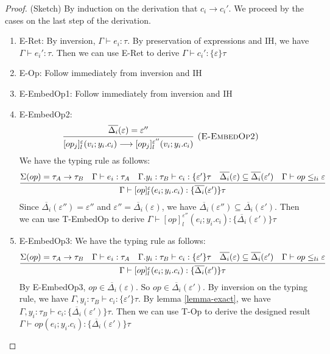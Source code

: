 \begin{proof} (Sketch)
By induction on the derivation that $c_i \longrightarrow c_i'$. We proceed by the cases on the last step of the derivation.

\begin{enumerate}
\item E-Ret: By inversion, $\Gamma \vdash e_i: \tau$. By preservation of expressions and IH, we have  $\Gamma \vdash e_i': \tau$. Then we can use E-Ret to derive $\Gamma  \vdash c_i' : \{\varepsilon\} \tau$
\item E-Op: Follow immediately from inversion and IH
\item E-EmbedOp1: Follow immediately from inversion and IH
\item E-EmbedOp2:  
$$\infer[\textsc{(E-EmbedOp2)}]
{[op_j]^\varepsilon_l(v_i; y_i.c_i) \longrightarrow [op_j]^{\varepsilon''}_l(v_i; y_i.c_i) }
{\overline{\Delta_i}(\varepsilon) = \varepsilon''} \quad $$
We have the typing rule as follows:
$$\infer
  {\Gamma\vdash [op]^\varepsilon_l(e_i; y_i.c_i) : \{\overline{\Delta_i}(\varepsilon')\}\tau }
  {
  \Sigma(op) = \tau_A \rightarrow \tau_B & \Gamma \vdash e_i : \tau_A & \Gamma. y_i:\tau_B\vdash c_i: \{\varepsilon'\}\tau & \overline{\Delta_i}(\varepsilon) \subseteq \overline{\Delta_i}(\varepsilon') & \Gamma \vdash op \leq_{li} \varepsilon
  }  $$
  Since $\overline{\Delta_i}(\varepsilon'') = \varepsilon''$ and $\varepsilon'' = \overline{\Delta_i}(\varepsilon)$, we have $\overline{\Delta_i}(\varepsilon'')  \subseteq \overline{\Delta_i}(\varepsilon')$. Then we can use T-EmbedOp to derive $\Gamma\vdash [op]^{\varepsilon''}_l(e_i; y_i.c_i) : \{\overline{\Delta_i}(\varepsilon')\}\tau $
\item E-EmbedOp3:
  We have the typing rule as follows:
$$\infer
  {\Gamma\vdash [op]^\varepsilon_l(e_i; y_i.c_i) : \{\overline{\Delta_i}(\varepsilon')\}\tau }
  {\Sigma(op) = \tau_A \rightarrow \tau_B & \Gamma \vdash e_i : \tau_A & \Gamma. y_i:\tau_B\vdash c_i: \{\varepsilon'\}\tau & \overline{\Delta_i}(\varepsilon) \subseteq \overline{\Delta_i}(\varepsilon') & \Gamma \vdash op \leq_{li} \varepsilon}  $$
  By E-EmbedOp3, $op \in \overline{\Delta_i}(\varepsilon)$. So $op \in \overline{\Delta_i}(\varepsilon')$. 
By inversion on the typing rule, we have $\Gamma, y_i:\tau_B\vdash c_i: \{\varepsilon'\}\tau$. By lemma \ref{lemma-exact}, we have $\Gamma, y_i:\tau_B\vdash c_i: \{\overline{\Delta_i}(\varepsilon')\}\tau$. Then we can use T-Op to derive the designed result $\Gamma \vdash op(e_i; y_i.c_i) : \{\overline{\Delta_i}(\varepsilon')\}\tau $


\end{enumerate}
\end{proof}
